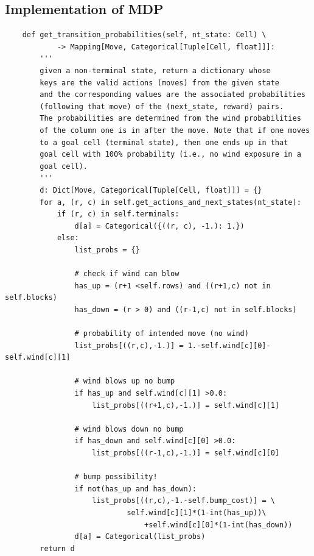 \documentclass{article}[12pt]
\begin{document}
\subsection{Implementation of MDP}
\begin{lstlisting}
    def get_transition_probabilities(self, nt_state: Cell) \
            -> Mapping[Move, Categorical[Tuple[Cell, float]]]:
        '''
        given a non-terminal state, return a dictionary whose
        keys are the valid actions (moves) from the given state
        and the corresponding values are the associated probabilities
        (following that move) of the (next_state, reward) pairs.
        The probabilities are determined from the wind probabilities
        of the column one is in after the move. Note that if one moves
        to a goal cell (terminal state), then one ends up in that
        goal cell with 100% probability (i.e., no wind exposure in a
        goal cell).
        '''
        d: Dict[Move, Categorical[Tuple[Cell, float]]] = {}
        for a, (r, c) in self.get_actions_and_next_states(nt_state):
            if (r, c) in self.terminals:
                d[a] = Categorical({((r, c), -1.): 1.})
            else:
                list_probs = {}

                # check if wind can blow
                has_up = (r+1 <self.rows) and ((r+1,c) not in self.blocks)
                has_down = (r > 0) and ((r-1,c) not in self.blocks)

                # probability of intended move (no wind)
                list_probs[((r,c),-1.)] = 1.-self.wind[c][0]-self.wind[c][1]

                # wind blows up no bump
                if has_up and self.wind[c][1] >0.0:
                    list_probs[((r+1,c),-1.)] = self.wind[c][1]
                
                # wind blows down no bump
                if has_down and self.wind[c][0] >0.0:
                    list_probs[((r-1,c),-1.)] = self.wind[c][0]
    
                # bump possibility!
                if not(has_up and has_down): 
                    list_probs[((r,c),-1.-self.bump_cost)] = \
                            self.wind[c][1]*(1-int(has_up))\
                                +self.wind[c][0]*(1-int(has_down))
                d[a] = Categorical(list_probs)
        return d
   \end{lstlisting}
\end{document}
